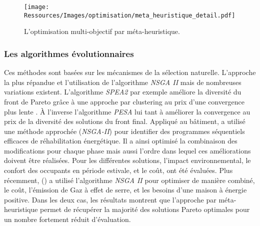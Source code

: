 \begin{figure}
    \begin{center}
        \texttt{[image: Ressources/Images/optimisation/meta\_heuristique\_detail.pdf]}
    \end{center}
    \caption{L’optimisation multi-objectif par méta-heuristique.
             \label{fig:multi_meta_detail}}
\end{figure}

\subsubsection{Les algorithmes évolutionnaires} %
\label{ssub:les_algorithmes_evolutionnaires}
Ces méthodes sont basées sur les mécanismes de la sélection naturelle.
L’approche la plus répandue et l’utilisation de l’algorithme \textit{NSGA II}
\parencite{Deb2002182} mais de nombreuses variations existent. L’algorithme
\textit{SPEA2} par exemple améliore la diversité du front de Pareto grâce à une approche
par clustering au prix d’une convergence plus lente \parencite{Zitzler2001}. À
l’inverse l’algorithme \textit{PESA} lui tant à améliorer la convergence au prix
de la diversité des solutions du front final. Appliqué au bâtiment,
\cite{Rivallain2013} a utilisé une méthode approchée (\textit{NSGA-II}) pour identifier
des programmes séquentiels efficaces de réhabilitation énergétique. Il a ainsi
optimisé la combinaison des modifications pour chaque phase mais aussi l’ordre
dans lequel ces améliorations doivent être réalisées. Pour les différentes
solutions, l’impact environnemental, le confort des occupants en période
estivale, et le coût, ont été évaluées. Plus récemment, () a
utilisé l’algorithme \textit{NSGA II} pour optimiser de manière combiné, le coût,
l’émission de Gaz à effet de serre, et les besoins d’une maison à énergie
positive. Dans les deux cas, les résultats montrent que l’approche par méta-
heuristique permet de récupérer la majorité des solutions Pareto optimales pour
un nombre fortement réduit d’évaluation.


